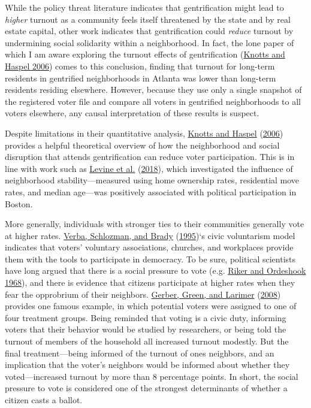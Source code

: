 \documentclass[
  12pt,
]{article}
\begin{document}
While the policy threat literature indicates that gentrification might lead to \emph{higher} turnout as a community feels itself threatened by the state and by real estate capital, other work indicates that gentrification could \emph{reduce} turnout by undermining social solidarity within a neighborhood. In fact, the lone paper of which I am aware exploring the turnout effects of gentrification (\protect\hyperlink{ref-Knotts2006}{Knotts and Haspel 2006}) comes to this conclusion, finding that turnout for long-term residents in gentrified neighborhoods in Atlanta was lower than long-term residents residing elsewhere. However, because they use only a single snapshot of the registered voter file and compare all voters in gentrified neighborhoods to all voters elsewhere, any causal interpretation of these results is suspect.

Despite limitations in their quantitative analysis, \protect\hyperlink{ref-Knotts2006}{Knotts and Haspel} (\protect\hyperlink{ref-Knotts2006}{2006}) provides a helpful theoretical overview of how the neighborhood and social disruption that attends gentrification can reduce voter participation. This is in line with work such as \protect\hyperlink{ref-Levine2018}{Levine et al.} (\protect\hyperlink{ref-Levine2018}{2018}), which investigated the influence of neighborhood stability---measured using home ownership rates, residential move rates, and median age---was positively associated with political participation in Boston.

More generally, individuals with stronger ties to their communities generally vote at higher rates. \protect\hyperlink{ref-Verba1995}{Verba, Schlozman, and Brady} (\protect\hyperlink{ref-Verba1995}{1995})`s civic voluntarism model indicates that voters' voluntary associations, churches, and workplaces provide them with the tools to participate in democracy. To be sure, political scientists have long argued that there is a social pressure to vote (e.g. \protect\hyperlink{ref-Riker1968}{Riker and Ordeshook 1968}), and there is evidence that citizens participate at higher rates when they fear the opprobrium of their neighbors. \protect\hyperlink{ref-Gerber2008}{Gerber, Green, and Larimer} (\protect\hyperlink{ref-Gerber2008}{2008}) provides one famous example, in which potential voters were assigned to one of four treatment groups. Being reminded that voting is a civic duty, informing voters that their behavior would be studied by researchers, or being told the turnout of members of the household all increased turnout modestly. But the final treatment---being informed of the turnout of ones neighbors, and an implication that the voter's neighbors would be informed about whether they voted---increased turnout by more than 8 percentage points. In short, the social pressure to vote is considered one of the strongest determinants of whether a citizen casts a ballot.
\end{document}
